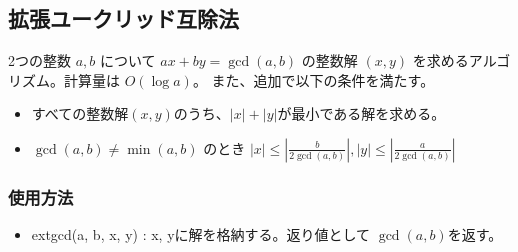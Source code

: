 \subsection{拡張ユークリッド互除法}

2つの整数 $a,b$ について $ax + by = \gcd(a,b)$ の整数解 $(x, y)$ を求めるアルゴリズム。計算量は $O(\log a)$。
また、追加で以下の条件を満たす。

\begin{itemize}
    \item すべての整数解$(x,y)$のうち、$|x| + |y|$が最小である解を求める。
    \item $\gcd(a,b) \neq \min(a, b)$ のとき $|x| \le \left|\frac{b}{2\gcd(a,b)}\right|, |y| \le \left|\frac{a}{2\gcd(a,b)}\right|$
\end{itemize}

\subsubsection*{使用方法}

\begin{itemize}
    \item extgcd(a, b, x, y) : x, yに解を格納する。返り値として $\gcd(a,b)$を返す。
\end{itemize}


